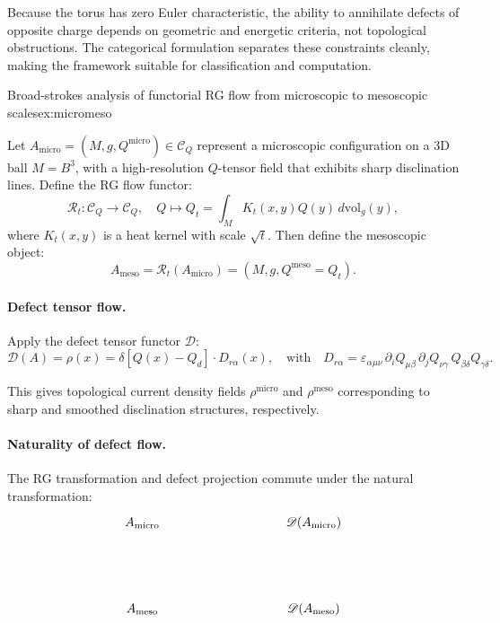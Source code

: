 	
	
	\begin{remark}
		Because the torus has zero Euler characteristic, the ability to annihilate defects of opposite charge depends on geometric and energetic criteria, not topological obstructions. The categorical formulation separates these constraints cleanly, making the framework suitable for classification and computation.
	\end{remark}
	
	\begin{example}{Broad-strokes analysis of functorial RG flow from microscopic to mesoscopic scales}{ex:micromeso}
		
		Let \( A_{\mathrm{micro}} = (M, g, Q^{\mathrm{micro}}) \in \mathcal{C}_Q \) represent a microscopic configuration on a 3D ball \( M = B^3 \), with a high-resolution \( Q \)-tensor field that exhibits sharp disclination lines. Define the RG flow functor:
		\[
		\mathcal{R}_t: \mathcal{C}_Q \to \mathcal{C}_Q, \quad Q \mapsto Q_t = \int_M K_t(x, y) Q(y) \, d\mathrm{vol}_g(y),
		\]
		where \( K_t(x,y) \) is a heat kernel with scale \( \sqrt{t} \). Then define the mesoscopic object:
		\[
		A_{\mathrm{meso}} = \mathcal{R}_t(A_{\mathrm{micro}}) = (M, g, Q^{\mathrm{meso}} = Q_t).
		\]
		
		\paragraph{Defect tensor flow.}
		Apply the defect tensor functor \( \mathscr{D} \):
		\[
		\mathscr{D}(A) = \rho(x) = \delta[Q(x) - Q_d] \cdot D_{r\alpha}(x),
		\quad \text{with} \quad D_{r\alpha} = \varepsilon_{\alpha\mu\nu} \, \partial_i Q_{\mu\beta} \, \partial_j Q_{\nu\gamma} \, Q_{\beta\delta} Q_{\gamma\delta}.
		\]
		
		This gives topological current density fields \( \rho^{\mathrm{micro}} \) and \( \rho^{\mathrm{meso}} \) corresponding to sharp and smoothed disclination structures, respectively.
		
		\paragraph{Naturality of defect flow.}
		The RG transformation and defect projection commute under the natural transformation:
		\[
		\begin{tikzpicture}[scale=1.2, baseline=(current bounding box.center)]
			\node (A) at (0,2) {$A_{\mathrm{micro}}$};
			\node (B) at (0,0) {$A_{\mathrm{meso}}$};
			\node (C) at (4,2) {$\mathscr{D}(A_{\mathrm{micro}})$};
			\node (D) at (4,0) {$\mathscr{D}(A_{\mathrm{meso}})$};
			

\end{tikzpicture}\]
\end{example}
